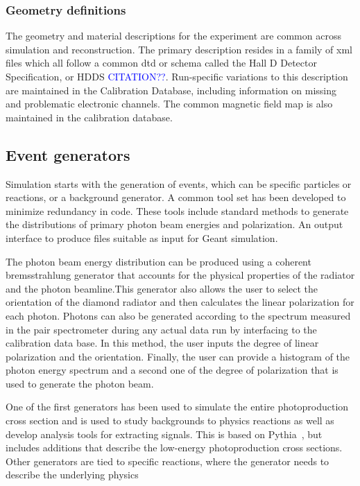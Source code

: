 \subsubsection[Material thickness]{\label{sec:materialscan}Geometry definitions}
The geometry and material descriptions for the experiment are common across simulation and reconstruction. The primary description resides in a family of xml files which all follow a common dtd or schema called the Hall D Detector Specification, or HDDS \textcolor{blue}{CITATION??}. Run-specific variations to this description are maintained in the Calibration Database, including information on missing and problematic electronic channels. The common magnetic field map is also maintained in the calibration database.

\subsection{Event generators \label{sec:generators}}
Simulation starts with the generation of events, which can be specific particles or reactions, or a background generator. A common tool set has been developed to minimize redundancy in code. These tools include standard methods to generate the distributions of primary photon beam energies and polarization. An output interface to produce files suitable as input for Geant simulation.

The photon beam energy distribution can be produced using a coherent bremsstrahlung generator that accounts for the physical properties of the radiator and the photon beamline.This generator also allows the user to select the orientation of the diamond radiator and then calculates the linear polarization for each photon. Photons can also be generated according to the spectrum measured in the pair spectrometer during any actual data run by interfacing to the calibration data base. In this method, the user inputs the degree of linear polarization and the orientation. Finally, the user can provide a histogram of the photon energy spectrum and a second one of the degree of polarization that is used to generate the photon beam. 

One of the first generators has been used to simulate the entire photoproduction cross section and is used to study backgrounds to physics reactions as well as develop analysis tools for extracting signals. This is based on Pythia~\cite{Sjostrand:2006za}, but includes additions that describe the low-energy photoproduction cross sections. Other generators are tied to specific reactions, where the generator needs to describe the underlying physics

